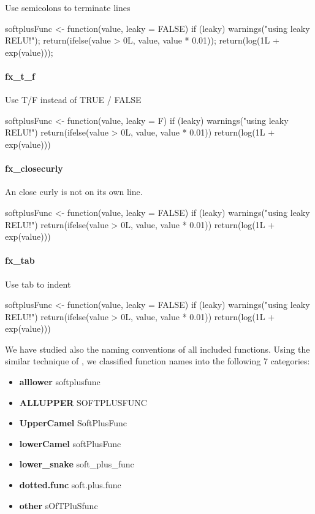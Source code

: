 Use semicolons to terminate lines

\begin{example}
softplusFunc <- function(value, leaky = FALSE) {
    if (leaky) {
        warnings("using leaky RELU!");
        return(ifelse(value > 0L, value, value * 0.01));
    }
    return(log(1L + exp(value)));
}
\end{example}

\paragraph{fx\_t\_f}

Use T/F instead of TRUE / FALSE

\begin{example}
softplusFunc <- function(value, leaky = F) {
    if (leaky) {
        warnings("using leaky RELU!")
        return(ifelse(value > 0L, value, value * 0.01))
    }
    return(log(1L + exp(value)))
}
\end{example}

\paragraph{fx\_closecurly}

An close curly is not on its own line.

\begin{example}
softplusFunc <- function(value, leaky = FALSE) {
    if (leaky) {
        warnings("using leaky RELU!")
        return(ifelse(value > 0L, value, value * 0.01)) }
    return(log(1L + exp(value))) }
\end{example}

\paragraph{fx\_tab}

Use tab to indent

\begin{example}
softplusFunc <- function(value, leaky = FALSE) {
    if (leaky) {
        warnings("using leaky RELU!")
        return(ifelse(value > 0L, value, value * 0.01))
    }
    return(log(1L + exp(value)))
}
\end{example}

We have studied also the naming conventions of all included functions. Using the similar technique of \citet{baaaath}, we classified function names into the following 7 categories:

\begin{itemize}
  \item \textbf{alllower} softplusfunc
  \item \textbf{ALLUPPER} SOFTPLUSFUNC
  \item \textbf{UpperCamel} SoftPlusFunc
  \item \textbf{lowerCamel} softPlusFunc
  \item \textbf{lower\_snake} soft\_plus\_func
  \item \textbf{dotted.func} soft.plus.func
  \item \textbf{other} sOfTPluSfunc
\end{itemize}

